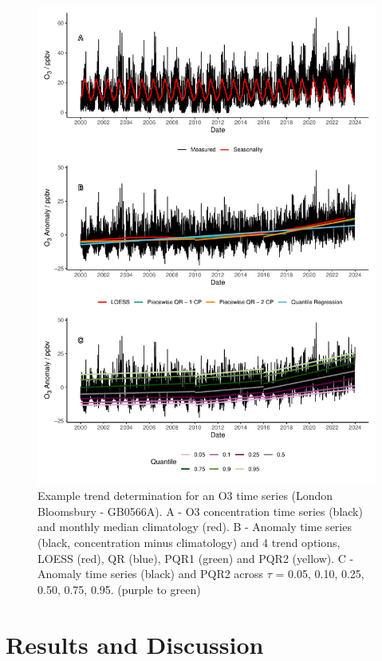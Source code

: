 \documentclass[journal abbreviation, manuscript]{copernicus}
\begin{document}
\begin{figure}[p]
\includegraphics[width=12cm]{figures/f1_method.pdf}
\caption{Example trend determination for an O3 time series (London Bloomsbury - GB0566A). A - O3 concentration time series (black) and monthly median climatology (red). B - Anomaly time series (black, concentration minus climatology) and 4 trend options, LOESS (red), QR (blue), PQR1 (green) and PQR2 (yellow). C - Anomaly time series (black) and PQR2 across $\tau$ = 0.05, 0.10, 0.25, 0.50, 0.75, 0.95. (purple to green)}
\label{fig:method_plot}
\end{figure}


\clearpage
\section{Results and Discussion}
\end{document}
